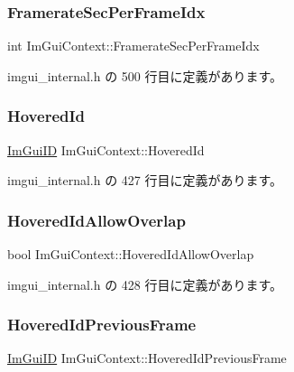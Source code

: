 \subsubsection{\texorpdfstring{Framerate\+Sec\+Per\+Frame\+Idx}{FramerateSecPerFrameIdx}}
{\footnotesize\ttfamily int Im\+Gui\+Context\+::\+Framerate\+Sec\+Per\+Frame\+Idx}



 imgui\+\_\+internal.\+h の 500 行目に定義があります。

\mbox{\label{struct_im_gui_context_a32bef5a7740179ad8076643b001f15e4}} 
\subsubsection{\texorpdfstring{Hovered\+Id}{HoveredId}}
{\footnotesize\ttfamily \mbox{\hyperlink{imgui_8h_a1785c9b6f4e16406764a85f32582236f}{Im\+Gui\+ID}} Im\+Gui\+Context\+::\+Hovered\+Id}



 imgui\+\_\+internal.\+h の 427 行目に定義があります。

\mbox{\label{struct_im_gui_context_a171f67ac705994d413a0bccf491aa4e1}} 
\subsubsection{\texorpdfstring{Hovered\+Id\+Allow\+Overlap}{HoveredIdAllowOverlap}}
{\footnotesize\ttfamily bool Im\+Gui\+Context\+::\+Hovered\+Id\+Allow\+Overlap}



 imgui\+\_\+internal.\+h の 428 行目に定義があります。

\mbox{\label{struct_im_gui_context_a08742c14087e26304ff47fb9212d8eb6}} 
\subsubsection{\texorpdfstring{Hovered\+Id\+Previous\+Frame}{HoveredIdPreviousFrame}}
{\footnotesize\ttfamily \mbox{\hyperlink{imgui_8h_a1785c9b6f4e16406764a85f32582236f}{Im\+Gui\+ID}} Im\+Gui\+Context\+::\+Hovered\+Id\+Previous\+Frame}



